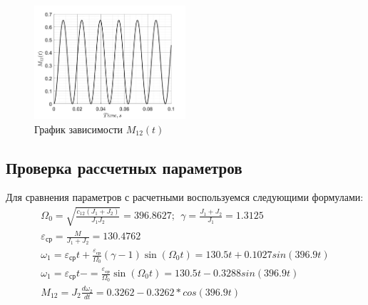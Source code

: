 \begin{figure}[!h]
    \centering
    \includegraphics[width=0.5\textwidth]{img/model_M12}
    \caption{График зависимости $M_{12}(t)$}
    \label{fig:model_M12}
\end{figure}

\subsection{Проверка рассчетных параметров}
Для сравнения параметров с расчетными воспользуемся следующими формулами:
\begin{gather*}
    \Omega_0 = \sqrt {\frac{c_{12}(J_1+J_2)}{J_1 J_2}}= 396.8627; \ \ \gamma = \frac{J_1+J_2}{J_1} = 1.3125\\
    \varepsilon_\text{ср} = \frac{M}{J_1+J_2} = 130.4762\\
    \omega_1 = \varepsilon_{\text{ср}} t + \frac{\varepsilon_{\text{ср}}}{\Omega_0}(\gamma-1)\sin(\Omega_0 t) = 130.5t + 0.1027sin(396.9t)\\
    \omega_1 = \varepsilon_{\text{ср}} t -= \frac{\varepsilon_{\text{ср}}}{\Omega_0}\sin(\Omega_0 t) =130.5t - 0.3288sin(396.9t)\\
    M_{12} = J_2\frac{d\omega_2}{dt} = 0.3262 - 0.3262*cos(396.9t)
\end{gather*}

